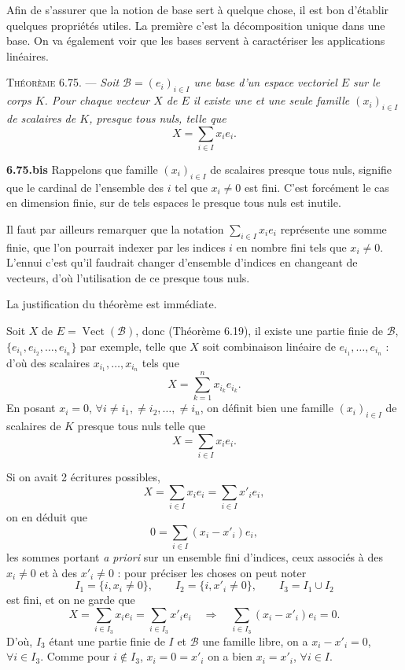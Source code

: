 

Afin de s'assurer que la notion de base sert à quelque chose, il est bon d'établir quelques propriétés utiles. La première c'est la décomposition unique dans une base. On va également voir que les bases servent à caractériser les applications linéaires.

\medskip\noindent\textsc{Théorème 6.75.} --- \emph{Soit $\mathcal B=(e_i)_{i\in I}$ une base d'un espace vectoriel $E$ sur le corps $K$. Pour chaque vecteur $X$ de $E$ il existe une et une seule famille $(x_i)_{i\in I}$ de scalaires de $K$, presque tous nuls, telle que
\[
X=\sum_{i\in I}x_i e_i.
\]}

\medskip\noindent\textbf{6.75.bis} Rappelons que famille $(x_i)_{i\in I}$ de scalaires presque tous nuls, signifie que le cardinal de l'ensemble des $i$ tel que $x_i\ne0$ est fini. C'est forcément le cas en dimension finie, sur de tels espaces le presque tous nuls est inutile.

Il faut par ailleurs remarquer que la notation $\sum_{i\in I}x_i e_i$ représente une somme finie, que l'on pourrait indexer par les indices $i$ en nombre fini tels que $x_i\ne0$. L'ennui c'est qu'il faudrait changer d'ensemble d'indices en changeant de vecteurs, d'où l'utilisation de ce presque tous nuls.

La justification du théorème est immédiate.

Soit $X$ de $E=\operatorname{Vect}(\mathcal B)$, donc (Théorème 6.19), il existe une partie finie de $\mathcal B$, $\{e_{i_1},e_{i_2},\ldots,e_{i_n}\}$ par exemple, telle que $X$ soit combinaison linéaire de $e_{i_1},\ldots,e_{i_n}$ : d'où des scalaires $x_{i_1},\ldots,x_{i_n}$ tels que
\[
X=\sum_{k=1}^n x_{i_k}e_{i_k}.
\]
En posant $x_i=0$, $\forall i\ne i_1,\ne i_2,\ldots,\ne i_n$, on définit bien une famille $(x_i)_{i\in I}$ de scalaires de $K$ presque tous nuls telle que
\[
X=\sum_{i\in I}x_i e_i.
\]

Si on avait 2 écritures possibles,
\[
X=\sum_{i\in I}x_i e_i=\sum_{i\in I}x'_i e_i,
\]
on en déduit que
\[
0=\sum_{i\in I}(x_i-x'_i)e_i,
\]
les sommes portant \emph{a priori} sur un ensemble fini d'indices, ceux associés à des $x_i\ne0$ et à des $x'_i\ne0$ : pour préciser les choses on peut noter
\[
I_1=\{i,x_i\ne0\},\qquad I_2=\{i,x'_i\ne0\},\qquad I_3=I_1\cup I_2
\]
est fini, et on ne garde que
\[
X=\sum_{i\in I_3}x_i e_i=\sum_{i\in I_3}x'_i e_i
\quad\Longrightarrow\quad
\sum_{i\in I_3}(x_i-x'_i)e_i=0.
\]
D'où, $I_3$ étant une partie finie de $I$ et $\mathcal B$ une famille libre, on a $x_i-x'_i=0$, $\forall i\in I_3$. Comme pour $i\notin I_3$, $x_i=0=x'_i$ on a bien $x_i=x'_i$, $\forall i\in I$. \bookend

